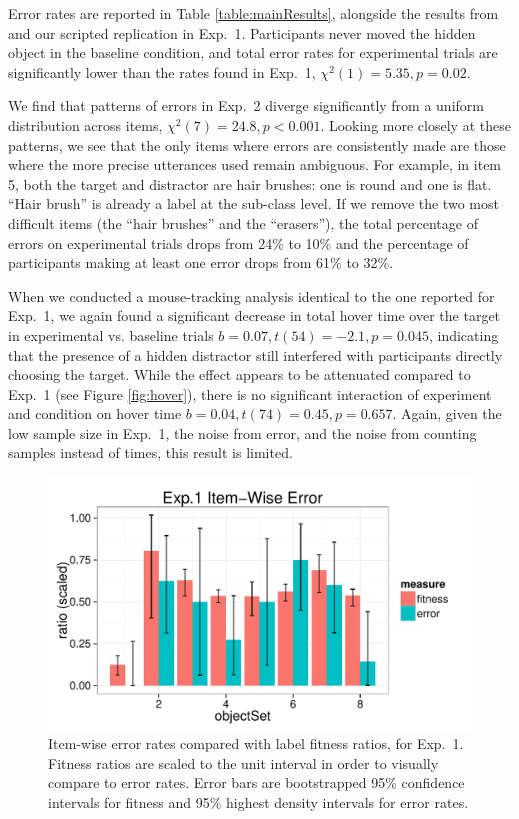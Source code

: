 \documentclass[10pt,letterpaper]{article}
\begin{document}
Error rates are reported in Table \ref{table:mainResults}, alongside the results from  and our scripted replication in Exp.~1. Participants never moved the hidden object in the baseline condition, and total error rates for experimental trials are significantly lower than the rates found in Exp.~1, $\chi^2(1) = 5.35, p = 0.02$.

We find that patterns of errors in Exp.~2 diverge significantly from a uniform distribution across items, $\chi^2(7) = 24.8, p < 0.001$. Looking more closely at these patterns, we see that the only items where errors are consistently made are those where the more precise utterances used remain ambiguous. For example, in item 5, both the target and distractor are hair brushes: one is round and one is flat. ``Hair brush'' is already a label at the sub-class level. If we remove the two most difficult items (the ``hair brushes'' and the ``erasers''), the total percentage of errors on experimental trials drops from 24\% to 10\% and the percentage of participants making at least one error drops from 61\% to 32\%.

When we conducted a mouse-tracking analysis identical to the one reported for Exp.~1, we again found a significant decrease in total hover time over the target in experimental vs. baseline trials $b = 0.07, t(54) = -2.1, p = 0.045$, indicating that the presence of a hidden distractor still interfered with participants directly choosing the target. While the effect appears to be attenuated compared to Exp.~1 (see Figure \ref{fig:hover}), there is no significant interaction of experiment and condition on hover time $b = 0.04, t(74) = 0.45, p = 0.657$. Again, given the low sample size in Exp.~1, the noise from error, and the noise from counting samples instead of times, this result is limited.
\begin{figure}[t!]
\begin{center}
\includegraphics[scale=.5]{images/itemwisefitness.pdf}
\caption{Item-wise error rates compared with label fitness ratios, for Exp.~1. Fitness ratios are scaled to the unit interval in order to visually compare to error rates. Error bars are bootstrapped 95\% confidence intervals for fitness and 95\% highest density intervals for error rates.}
\label{fig:itemLevel}
\end{center}
\end{figure}
\end{document}
